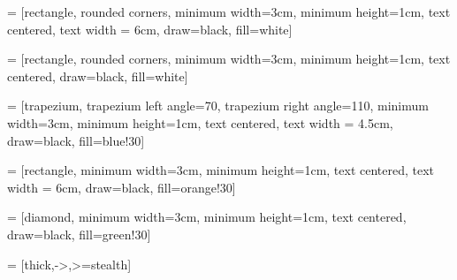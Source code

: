 \documentclass{Thesis}
\begin{document}
\usepackage[utf8]{inputenc}
\usepackage{wrapfig}
\usepackage{lscape}
\usepackage{rotating}
\usepackage{graphicx}
\usepackage{caption}
\usepackage{amsmath, nccmath}
\usepackage{comment}
\usepackage{afterpage}
\usepackage{multirow}
\usepackage{multicol}
\usepackage{cleveref}
\usepackage{rotating}
\usepackage[font=small]{caption}
\usepackage{subcaption}
\usepackage{makecell}
\usepackage{booktabs}
\usepackage{multirow}
\usepackage{lscape}
\usepackage{longtable}
\usepackage{placeins}
\usepackage{adjustbox}
\usepackage{enumitem} %
\usepackage{amssymb}
\usepackage{afterpage}
\usepackage{lipsum}

\usepackage{tikz}
\usetikzlibrary{shapes.geometric, arrows}

 = [rectangle, rounded corners, minimum width=3cm, minimum height=1cm, text centered, text width = 6cm, draw=black, fill=white]

 = [rectangle, rounded corners, minimum width=3cm, minimum height=1cm, text centered, draw=black, fill=white]

 = [trapezium, trapezium left angle=70, trapezium right angle=110, minimum width=3cm, minimum height=1cm, text centered, text width = 4.5cm, draw=black, fill=blue!30]

 = [rectangle, minimum width=3cm, minimum height=1cm, text centered, text width = 6cm, draw=black, fill=orange!30]

 = [diamond, minimum width=3cm, minimum height=1cm, text centered, draw=black, fill=green!30]

 = [thick,->,>=stealth]

\usepackage{pgfgantt}
\usepackage{xcolor}

\newcommand\myemptypage{
    \null
    \thispagestyle{empty}
    \addtocounter{page}{-1}
    \newpage
    }
    




\graphicspath{{Pictures/}} %
\usepackage[authoryear]{natbib}
%
\title{\ttitle} %
\end{document}
